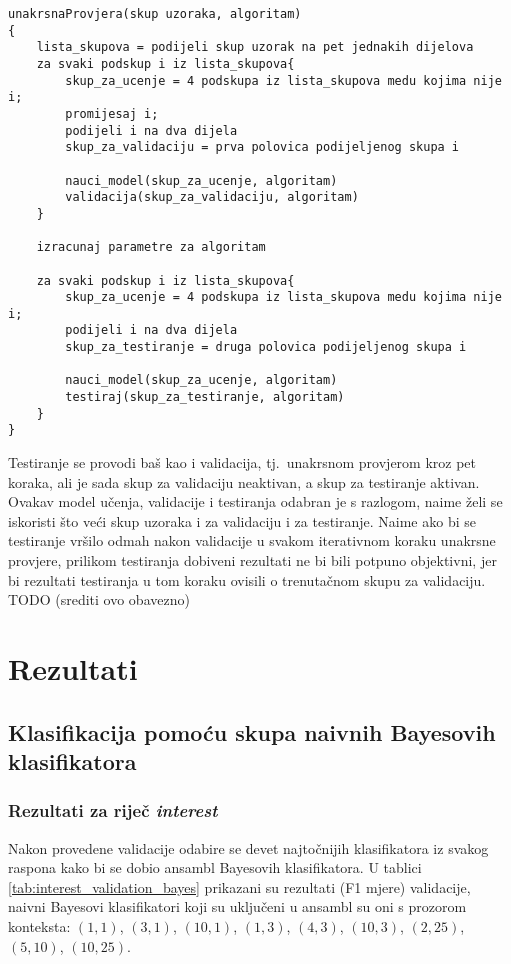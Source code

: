 \documentclass[10pt, a4paper]{article}
\begin{document}
\begin{lstlisting}[label=lst:Convolution1D,caption= Pseudok\^od implementirane unakrsne provjere]
unakrsnaProvjera(skup uzoraka, algoritam)
{
	lista_skupova = podijeli skup uzorak na pet jednakih dijelova
	za svaki podskup i iz lista_skupova{
		skup_za_ucenje = 4 podskupa iz lista_skupova medu kojima nije i;
		promijesaj i;
		podijeli i na dva dijela
		skup_za_validaciju = prva polovica podijeljenog skupa i
		
		nauci_model(skup_za_ucenje, algoritam)
		validacija(skup_za_validaciju, algoritam)
	}
		
	izracunaj parametre za algoritam
	
	za svaki podskup i iz lista_skupova{
		skup_za_ucenje = 4 podskupa iz lista_skupova medu kojima nije i;
		podijeli i na dva dijela
		skup_za_testiranje = druga polovica podijeljenog skupa i
		
		nauci_model(skup_za_ucenje, algoritam)
		testiraj(skup_za_testiranje, algoritam)
	} 	
}
\end{lstlisting}


Testiranje se provodi baš kao i validacija, tj.~unakrsnom provjerom kroz pet koraka, 
ali je sada skup za validaciju neaktivan, a skup za testiranje aktivan.
Ovakav model učenja, validacije i testiranja odabran je s razlogom, naime
želi se iskoristi što veći skup uzoraka i za validaciju i za testiranje.
Naime ako bi se testiranje vršilo odmah nakon validacije u svakom iterativnom
koraku unakrsne provjere, prilikom testiranja dobiveni rezultati ne bi bili
potpuno objektivni, jer bi rezultati testiranja u tom koraku ovisili
o trenutačnom skupu za validaciju. TODO (srediti ovo obavezno)

\section{Rezultati}
\subsection{Klasifikacija pomoću skupa naivnih Bayesovih klasifikatora}
\subsubsection{Rezultati za riječ \emph{interest}} 
Nakon provedene validacije odabire se devet najtočnijih klasifikatora iz
svakog raspona kako bi se dobio ansambl Bayesovih klasifikatora. 
U tablici \ref{tab:interest_validation_bayes} prikazani su rezultati (F1 mjere)
validacije, naivni Bayesovi klasifikatori koji su uključeni u ansambl su oni
s prozorom konteksta: $(1,1)$, $(3,1)$, $(10,1)$,
$(1,3)$, $(4,3)$, $(10,3)$, $(2,25)$, $(5,10)$, $(10,25)$.
\end{document}
